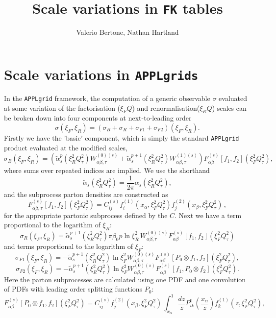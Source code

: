 \documentclass[11pt]{article}
\title{Scale variations in {\tt FK} tables}
\author{Valerio Bertone, Nathan Hartland}
\newcommand{\be}{\begin{equation}}
\newcommand{\ee}{\end{equation}}
\begin{document}
\maketitle
\section{Scale variations in {\tt APPLgrids}}
In the {\tt APPLgrid} framework, the computation of a generic observable $\sigma$ evaluated at some variation of the factorisation ($\xi_FQ$) and
renormalisation($\xi_RQ$) scales can be broken down into four components at next-to-leading order
\be \sigma(\xi_F, \xi_R) = \left( \sigma_B + \sigma_R + \sigma_{F1} + \sigma_{F2}\right)(\xi_F, \xi_R).\ee
Firstly we have the 'basic' component, which is simply the standard {\tt APPLgrid} product evaluated at the modified scales,
\be \sigma_B(\xi_F, \xi_R) =  \left(\tilde{\alpha}_s^{p}(\xi_R^2Q^2_\tau) 
     W_{\alpha\beta,\tau}^{(0)(s)}+ \tilde{\alpha}_s^{p+1}(\xi_R^2Q^2_\tau) W_{\alpha\beta,\tau}^{(1)(s)} \right)
     F^{(s)}_{\alpha\beta}\left[f_1, f_2\right]\left(\xi_F^2{Q^2_\tau}\right), \ee
where sums over repeated indices are implied. We use the shorthand
\be \tilde{\alpha}_s(\xi_R^2Q^2_\tau) =  \frac{1}{2\pi}\alpha_s\left(\xi_R^2 {Q^2_\tau}\right), \ee
and the subprocess parton densities are constructed as
\be \label{eq:basicsubproc}
  F^{(s)}_{\alpha\beta,\tau}\left[f_1, f_2\right]\left(\xi_F^2{Q^2_\tau}\right) = C^{(s)}_{ij} 
  f^{(1)}_i(x_{\alpha},\xi_F^2Q^2_\tau)f_j^{(2)}(x_{\beta},\xi_F^2Q^2_\tau)\,,
\ee
for the appropriate partonic subprocess defined by the $C$. Next we have a term proportional to the logarithm of $\xi_R$:
\be \sigma_R(\xi_F, \xi_R) = \tilde{\alpha}_s^{p+1}(\xi_R^2Q^2_\tau) 
      \pi  \beta_0 p \ln \xi_R^2
         \,
         W_{\alpha\beta,\tau}^{(0)(s)}
    F^{(s)}_{\alpha\beta}\left[f_1, f_2\right]\left(\xi_F^2{Q^2_\tau}\right)  \ee
and terms proportional to the logarithm of $\xi_F$:
\be \sigma_{F1}(\xi_F, \xi_R) =-\tilde{\alpha}_s^{p+1}(\xi_R^2Q^2_\tau)
\ln \xi_F^2  W_{\alpha\beta,\tau}^{(0)(s)}
F^{(s)}_{\alpha\beta}[P_0\otimes f_1, f_2](\xi_F^2{Q^2_\tau}),
\ee
\be \sigma_{F2}(\xi_F, \xi_R) =-\tilde{\alpha}_s^{p+1}(\xi_R^2Q^2_\tau)
\ln \xi_F^2  W_{\alpha\beta,\tau}^{(0)(s)}
F^{(s)}_{\alpha\beta}[f_1, P_0\otimes f_2](\xi_F^2{Q^2_\tau}).
\ee
Here the parton subprocesses are calculated using one PDF and one convolution of PDFs with leading order splitting functions $P_0$:
\be \label{eq:convsubprocess1} F^{(s)}_{\alpha\beta}[P_0\otimes f_1, f_2](\xi_F^2{Q^2_\tau})= C^{(s)}_{ij} 
 f_j^{(2)}(x_{\beta},\xi_F^2Q^2_\tau)\,  \int_{x_\alpha}^1 \frac{dz}{z}P^0_{ik}\left(\frac{x_\alpha}{z}\right)f^{(1)}_k(z,\xi_F^2Q^2_\tau), \ee
\end{document}
